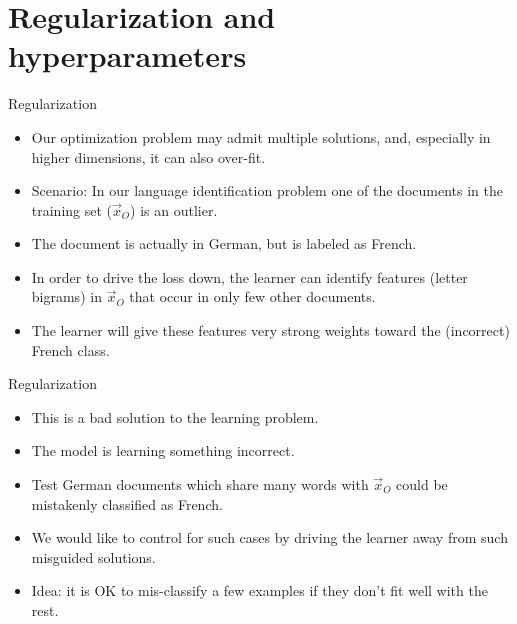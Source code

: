 \documentclass[handout]{beamer}
\begin{document}
\section{Regularization and hyperparameters}

\begin{frame}{Regularization}
\begin{scriptsize}
\begin{itemize}
 \item Our optimization problem may admit multiple solutions, and, especially in higher dimensions, it can also over-fit.
 \item Scenario: In our language identification problem one of the documents in the training set ($\vec{x}_O$) is an outlier.
 \item The document is actually in German, but is labeled as French.
 
 \item In order to drive the loss down, the learner can identify features (letter bigrams) in $\vec{x}_O$ that occur in only few other documents.
 
 \item The learner will give these features very strong weights toward the (incorrect) French class. 

\end{itemize}
\end{scriptsize}

\end{frame}


\begin{frame}{Regularization}
\begin{scriptsize}
\begin{itemize}
  \item This is a bad solution to the learning problem.
 \item The model is learning something incorrect.
 \item Test German documents which share many words with $\vec{x}_O$ could be mistakenly classified as French. 
 \item We would like to control for such cases by driving the learner away from such misguided solutions.
 \item Idea: it is OK to mis-classify a few examples if they don't fit well with the rest.
 
\end{itemize}
\end{scriptsize}

\end{frame}
\end{document}
